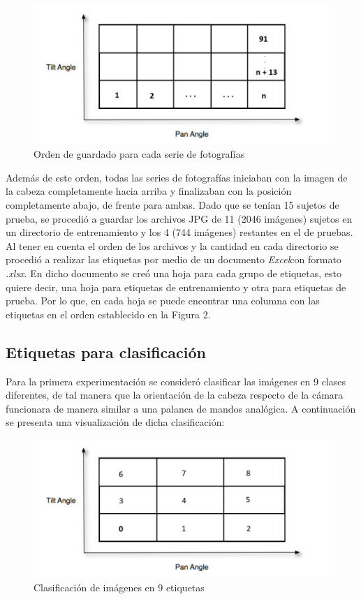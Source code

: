 \begin{figure}[H]
	\centering
	\includegraphics[scale=1]{figures/faceorder.png}
	\caption{Orden de guardado para cada serie de fotografías}
	\label{fig:img2}
\end{figure}

Además de este orden, todas las series de fotografías iniciaban con la imagen de la cabeza completamente hacia arriba y finalizaban con la posición completamente abajo, de frente para ambas. Dado que se tenían 15 sujetos de prueba, se procedió a guardar los archivos JPG de 11 (2046 imágenes) sujetos en un directorio de entrenamiento y los 4 (744 imágenes) restantes en el de pruebas. Al tener en cuenta el orden de los archivos y la cantidad en cada directorio se procedió a realizar las etiquetas por medio de un documento \textit{Excel}con formato \textit{.xlsx}. En dicho documento se creó una hoja para cada grupo de etiquetas, esto quiere decir, una hoja para etiquetas de entrenamiento y otra para etiquetas de prueba. Por lo que, en cada hoja se puede encontrar una columna con las etiquetas en el orden establecido en la Figura 2.

\subsection{Etiquetas para clasificación}

Para la primera experimentación se consideró clasificar las imágenes en 9 clases diferentes, de tal manera que la orientación de la cabeza respecto de la cámara funcionara de manera similar a una palanca de mandos analógica. A continuación se presenta una visualización de dicha clasificación:

\begin{figure}[H]
	\centering
	\includegraphics[scale=1]{figures/clasi0.png}
	\caption{Clasificación de imágenes en 9 etiquetas}
	\label{fig:img3}
\end{figure}

